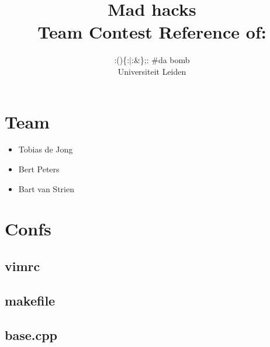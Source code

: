 \documentclass[10pt,hidelinks]{article}
\title{Mad hacks\\[1cm]
\small{Team Contest Reference of:}}
\author{:()\{:$\vert$:\&\};: \#da bomb\\[1cm]
	\small{Universiteit Leiden}}
\begin{document}
\fontsize{10}{12}


\maketitle

\newpage

\tableofcontents

\section{Team}
\begin{itemize}
\item Tobias de Jong
\item Bert Peters
\item Bart van Strien
\end{itemize}

\section{Confs}

\subsection{vimrc}


\subsection{makefile}


\lstset{language=c++}

\subsection{base.cpp}

\end{document}
